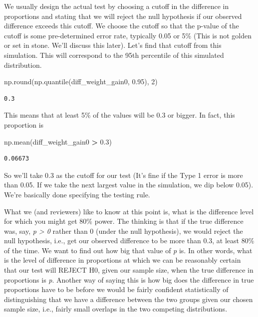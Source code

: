 \documentclass[
  letterpaper,
]{scrbook}
\newenvironment{Shaded}{\begin{snugshade}}{\end{snugshade}}
\newcommand{\BuiltInTok}[1]{#1}
\newcommand{\DecValTok}[1]{\textcolor[rgb]{0.00,0.00,0.81}{#1}}
\newcommand{\FloatTok}[1]{\textcolor[rgb]{0.00,0.00,0.81}{#1}}
\newcommand{\NormalTok}[1]{#1}
\newcommand{\OperatorTok}[1]{\textcolor[rgb]{0.81,0.36,0.00}{\textbf{#1}}}
\begin{document}
We usually design the actual test by choosing a cutoff in the difference in proportions and stating that we will reject the null hypothesis if our observed difference exceeds this cutoff. We choose the cutoff so that the p-value of the cutoff is some pre-determined error rate, typically 0.05 or 5\% (This is not golden or set in stone. We'll discuss this later). Let's find that cutoff from this simulation. This will correspond to the 95th percentile of this simulated distribution.

\begin{Shaded}
\begin{Highlighting}[]
\NormalTok{np.}\BuiltInTok{round}\NormalTok{(np.quantile(diff_weight_gain0, }\FloatTok{0.95}\NormalTok{), }\DecValTok{2}\NormalTok{)}
\end{Highlighting}
\end{Shaded}

\begin{verbatim}
0.3
\end{verbatim}

This means that at least 5\% of the values will be 0.3 or bigger. In fact, this proportion is

\begin{Shaded}
\begin{Highlighting}[]
\NormalTok{np.mean(diff_weight_gain0 }\OperatorTok{>} \FloatTok{0.3}\NormalTok{)}
\end{Highlighting}
\end{Shaded}

\begin{verbatim}
0.06673
\end{verbatim}

So we'll take 0.3 as the cutoff for our test (It's fine if the Type 1 error is more than 0.05. If we take the next largest value in the simulation, we dip below 0.05). We're basically done specifying the testing rule.

What we (and reviewers) like to know at this point is, what is the difference level for which you might get 80\% power. The thinking is that if the true difference was, say, \emph{p \textgreater{} 0} rather than 0 (under the null hypothesis), we would reject the null hypothesis, i.e., get our observed difference to be more than 0.3, at least 80\% of the time. We want to find out how big that value of \emph{p} is. In other words, what is the level of difference in proportions at which we can be reasonably certain that our test will REJECT H0, given our sample size, when the true difference in proportions is \emph{p}. Another way of saying this is how big does the difference in true proportions have to be before we would be fairly confident statistically of distinguishing that we have a difference between the two groups given our chosen sample size, i.e., fairly small overlaps in the two competing distributions.
\end{document}
